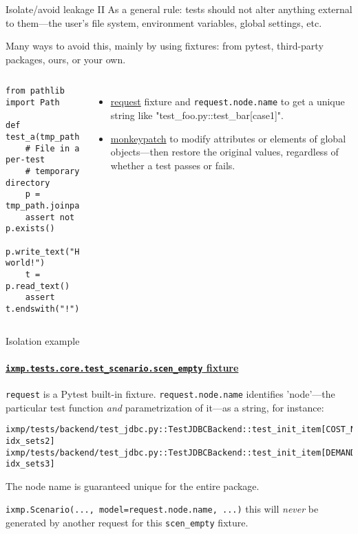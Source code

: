 \documentclass[12pt,aspectratio=169]{beamer}
\renewcommand{\mod}[1]{\texttt{#1}}
\newcommand{\py}[1]{\texttt{#1}}
\begin{document}
\begin{frame}[fragile]{Isolate/avoid leakage II}
As a general rule: tests should not alter anything external to them—the user's file system, environment variables, global settings, etc.

\medskip
Many ways to avoid this, mainly by using fixtures: from pytest, third-party packages, ours, or your own.
\begin{columns}[T]
\column{0.45\paperwidth}
\begin{verbatim}
from pathlib import Path

def test_a(tmp_path):
    # File in a per-test
    # temporary directory
    p = tmp_path.joinpath("file.txt")
    assert not p.exists()
    p.write_text("Hello, world!")
    t = p.read_text()
    assert t.endswith("!")
\end{verbatim}

\column{0.45\paperwidth}
\begin{itemize}
  \item \href{https://docs.pytest.org/en/stable/reference/reference.html\#pytest.FixtureRequest.node}{\ttfamily request} fixture and \texttt{request.node.name} to get a unique string like "test\_foo.py::test\_bar[case1]".
  \item \href{https://docs.pytest.org/en/stable/how-to/monkeypatch.html\#monkeypatching}{\ttfamily monkeypatch} to modify attributes or elements of global objects—then restore the original values, regardless of whether a test passes or fails.
\end{itemize}

\end{columns}
\end{frame}

\begin{frame}[fragile]{Isolation example}
\framesubtitle{\href{https://github.com/iiasa/ixmp/blob/049689a/ixmp/tests/core/test_scenario.py\#L22-L30}{\mod{ixmp.tests.core.test_scenario.scen_empty} fixture}}

\py{request} is a Pytest built-in fixture. \py{request.node.name} identifies 'node'—the particular test function \emph{and} parametrization of it—as a string, for instance:
\begin{verbatim}
ixmp/tests/backend/test_jdbc.py::TestJDBCBackend::test_init_item[COST_NODAL_NET-idx_sets2]
ixmp/tests/backend/test_jdbc.py::TestJDBCBackend::test_init_item[DEMAND-idx_sets3]
\end{verbatim}

\medskip
The node name is guaranteed unique for the entire package.

\medskip
\texttt{ixmp.Scenario(..., model=request.node.name, ...)} this will \emph{never} be generated by another request for this \py{scen_empty} fixture.
\end{frame}
\end{document}
